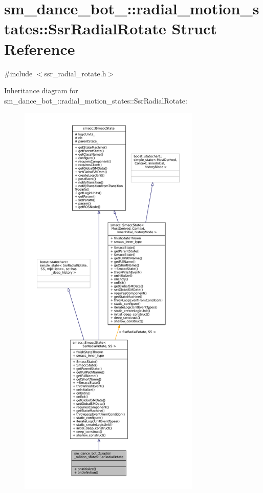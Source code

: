 \hypertarget{structsm__dance__bot__2_1_1radial__motion__states_1_1SsrRadialRotate}{}\section{sm\+\_\+dance\+\_\+bot\+\_\+:\+:radial\+\_\+motion\+\_\+states\+:\+:Ssr\+Radial\+Rotate Struct Reference}
\label{structsm__dance__bot__2_1_1radial__motion__states_1_1SsrRadialRotate}


{\ttfamily \#include $<$ssr\+\_\+radial\+\_\+rotate.\+h$>$}



Inheritance diagram for sm\+\_\+dance\+\_\+bot\+\_\+:\+:radial\+\_\+motion\+\_\+states\+:\+:Ssr\+Radial\+Rotate\+:
\nopagebreak
\begin{figure}[H]
\begin{center}
\leavevmode
\includegraphics[height=550pt]{structsm__dance__bot__2_1_1radial__motion__states_1_1SsrRadialRotate__inherit__graph}
\end{center}
\end{figure}


